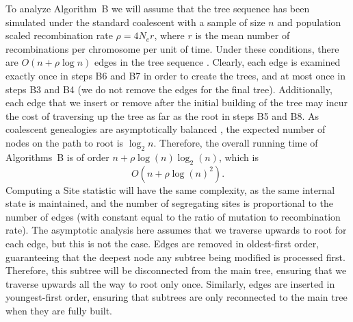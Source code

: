 \documentclass[9pt,twoside,lineno]{gsajnl}
\newcommand{\algorithmref}[1]{#1}
\begin{document}
To analyze Algorithm~\algorithmref{B} we will assume that the tree sequence has
been simulated under the standard coalescent with a sample of size
$n$ and population scaled recombination rate $\rho = 4 N_e r$,
where $r$ is the mean number of recombinations per chromosome per unit of time.
Under these conditions, there are $O(n + \rho \log n)$ edges in the tree sequence
\citep{kelleher2016efficient}.  Clearly, each edge is examined
exactly once in steps \algorithmref{B6} and \algorithmref{B7} in order to create
the trees, and at most once in steps \algorithmref{B3} and \algorithmref{B4} (we do
not remove the edges for the final tree). Additionally, each edge that
we insert or remove after the initial building of the tree
may incur the cost of traversing up the tree as
far as the root in steps \algorithmref{B5} and \algorithmref{B8}.
As coalescent genealogies are asymptotically
balanced \citep{li2013coalescent}, the expected number of nodes
on the path to root is $\log_2 n$.
Therefore, the overall running time
of Algorithms~\algorithmref{B} is of order $n + \rho \log(n) \log_2(n)$, which is
\begin{equation}\label{eqn:alg_complexity}
    O\left(n + \rho \log(n)^2 \right).
\end{equation}
Computing a Site statistic will have the same complexity,
as the same internal state is maintained,
and the number of segregating sites is proportional to the number of edges
(with constant equal to the ratio of mutation to recombination rate).
The asymptotic analysis here assumes that we traverse upwards to root
for each edge, but this is not the case. Edges are removed in
oldest-first order, guaranteeing that the deepest node any subtree being
modified is processed first. Therefore, this subtree will be disconnected from the
main tree, ensuring that we traverse upwards all the way to root only once.
Similarly, edges are inserted in youngest-first order, ensuring that subtrees are only
reconnected to the main tree when they are fully built.
\end{document}
